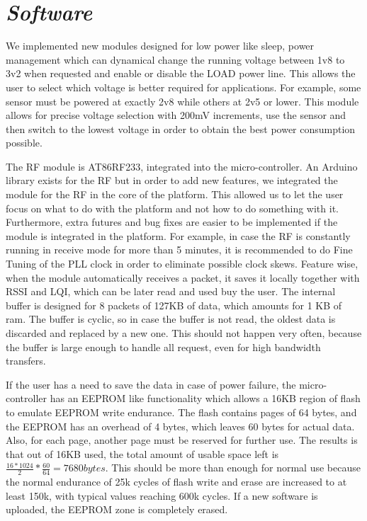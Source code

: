 \section{\textit{Software}}

We implemented new modules designed for low power like sleep, power management which can dynamical
change the running voltage between 1v8 to 3v2 when requested and enable or disable the LOAD power
line. This allows the user to select which voltage is better required for applications. For example,
some sensor must be powered at exactly 2v8 while others at 2v5 or lower. This module allows for
precise voltage selection with 200mV increments, use the sensor and then switch to the lowest
voltage in order to obtain the best power consumption possible.

The RF module is AT86RF233, integrated into the micro-controller. An Arduino library
\cite{rf233}
exists for the RF but in order to add new features, we integrated the module for the RF in the core
of the platform. This allowed us to let the user focus on what to do with the platform and not how to do
something with it. Furthermore, extra futures and bug fixes are easier to be implemented if the module is
integrated in the platform. For example, in case the RF is constantly running in receive mode for
more than 5 minutes, it is recommended to do Fine Tuning of the PLL clock in order to eliminate
possible clock skews. Feature wise, when the module automatically receives a packet, it saves it
locally together with RSSI and LQI, which can be later read and used buy the user. The internal
buffer is designed for 8 packets of 127KB of data, which amounts for 1 KB of ram. The buffer is
cyclic, so in case the buffer is not read, the oldest data is discarded and replaced by a new one.
This should not happen very often, because the buffer is large enough to handle all request, even
for high bandwidth transfers.

If the user has a need to save the data in case of power failure, the micro-controller has an
EEPROM like functionality which allows a 16KB region of flash to emulate EEPROM write endurance.
The flash contains pages of 64 bytes, and the EEPROM has an overhead of 4 bytes, which leaves 60
bytes for actual data. Also, for each page, another page must be reserved for further use.
The results is that out of 16KB used, the total amount of usable space left is $\frac{16*1024}{2}
* \frac{60}{64} = 7680 bytes$. This should be more than enough for normal use because the normal
endurance of 25k cycles of flash write and erase are increased to at least 150k, with typical
values reaching 600k cycles. If a new software is uploaded, the EEPROM zone is completely erased.

